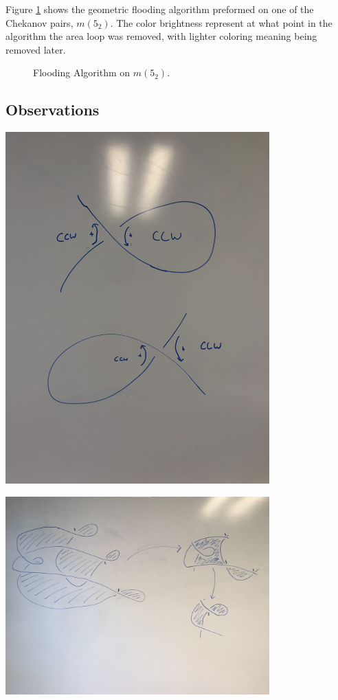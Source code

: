 \documentclass[11pt,oneside]{amsart}
\begin{document}
Figure \ref{fig:Flood} shows the geometric flooding algorithm preformed on one of the Chekanov pairs, $m(5_2)$. The color brightness represent at what point in the algorithm the area loop was removed, with lighter coloring meaning being removed later.


\begin{figure}[htbp]
  \label{fig:Flood}
  \centering
  
  \caption{Flooding Algorithm on $m(5_2)$.}
\end{figure}


\subsection{Observations}





\includegraphics[width=4in,angle=-90]{Pictures/Exterior Loops.JPG}



\includegraphics[width=4in]{Pictures/Visualization of Algorithm.JPG}
\end{document}
